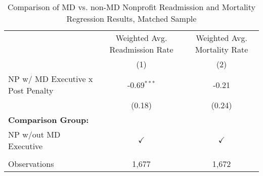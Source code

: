 \begin{table}[htbp]
   \caption{\label{tab:MD_noMD_matchsample} Comparison of MD vs. non-MD Nonprofit Readmission and Mortality Regression Results, Matched Sample}
   \bigskip
   \centering
   \begin{tabular}{lcc}
      \toprule
                                        & Weighted Avg. Readmission Rate & Weighted Avg. Mortality Rate\\  
                                        & (1)                            & (2)\\  
      \midrule 
      NP w/ MD Executive x Post Penalty & -0.69$^{***}$                  & -0.21\\   
                                        & (0.18)                         & (0.24)\\   
      \textbf{Comparison Group:}        &                                & \\  
      NP w/out MD Executive             & $\checkmark$                   & $\checkmark$\\   
       \\
      Observations                      & 1,677                          & 1,672\\  
      \bottomrule
   \end{tabular}
\end{table}
